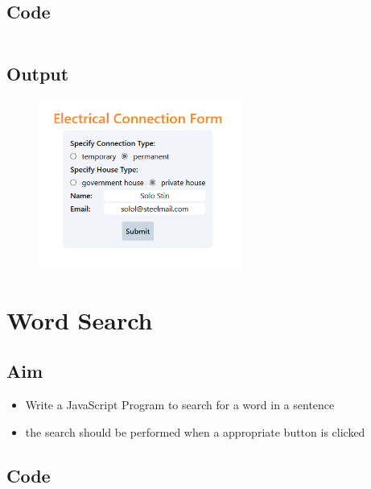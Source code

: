\documentclass{article}
\begin{document}
\subsection{Code}
\inputminted[frame=lines, linenos, breaklines, breakanywhere, numberblanklines=false]{html}{./prog_7/index.html}

\subsection{Output}
\begin{figure}[h!]
	\centering
	\includegraphics[width=0.6\textwidth]{./Assets/p07.png}
\end{figure}
\newpage

\section{Word Search}
\subsection{Aim}
\begin{itemize}
	\item Write a JavaScript Program to search for a word in a sentence
	\item the search should be performed when a appropriate button is clicked
\end{itemize}

\subsection{Code}
\inputminted[frame=lines, linenos, breaklines, breakanywhere, numberblanklines=false]{html}{./prog_8/index.html}

\newpage
\end{document}
